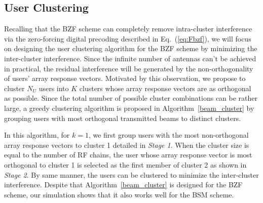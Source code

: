 \documentclass[conference]{IEEEtran}
\begin{document}
{\subsection{User Clustering}
Recalling that the BZF scheme can completely remove intra-cluster interference via the zero-forcing digital precoding described in Eq.~(\ref{eq:Fbzf}), we will focus on designing the user clustering algorithm for the BZF scheme by minimizing the inter-cluster interference. Since the infinite number of antennas can't be achieved in practical, the residual interference will be generated by the non-orthogonality of users' array response vectors. Motivated by this observation, we propose to cluster $N_U$ users into $K$ clusters whose array response vectors are as orthogonal as possible. Since the total number of possible cluster combinations can be rather large, a greedy clustering algorithm is proposed in Algorithm~\ref{beam_cluster} by grouping users with most orthogonal transmitted beams to distinct clusters.


In this algorithm, for $k=1$, we first group users with the most non-orthogonal array response vectors to cluster 1 detailed in \textit{Stage 1}. When the cluster size is equal to the number of RF chains, the user whose array response vector is most orthogonal to cluster 1 is selected as the first member of cluster 2 as shown in \textit{Stage 2}. By same manner, the users can be clustered to minimize the inter-cluster interference. Despite that Algorithm~\ref{beam_cluster} is designed for the BZF scheme, our simulation shows that it also works well for the BSM scheme.



}
\end{document}

